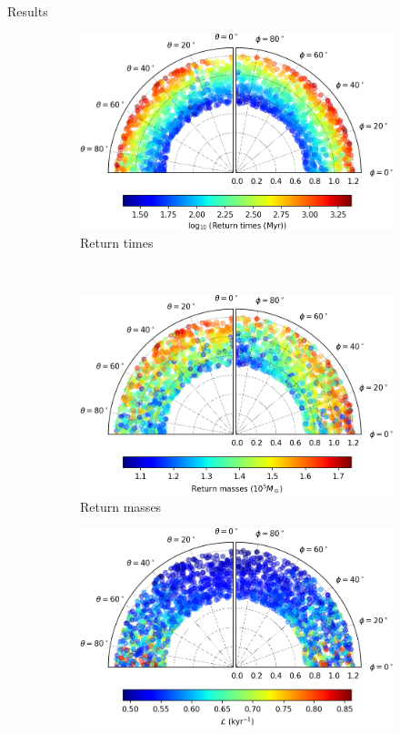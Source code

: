 \documentclass{beamer}
\begin{document}
\begin{frame}{Results}
	\begin{figure}[h]
		\centering
		\begin{subfigure}[t]{0.35\textwidth}
			\includegraphics[width = \textwidth]{"../Files/Week 13/images/24_time"}
			\caption{Return times}
		\end{subfigure}
		~ 
		\begin{subfigure}[t]{0.35\textwidth}
			\includegraphics[width=\textwidth]{"../Files/Week 13/images/24_mass"}
			\caption{Return masses}
		\end{subfigure}
		\begin{subfigure}[t]{0.35\textwidth}
			\includegraphics[width=\textwidth]{"../Files/Week 13/images/24_lyapunov"}

\end{subfigure}
\end{figure}
\end{frame}
\end{document}
